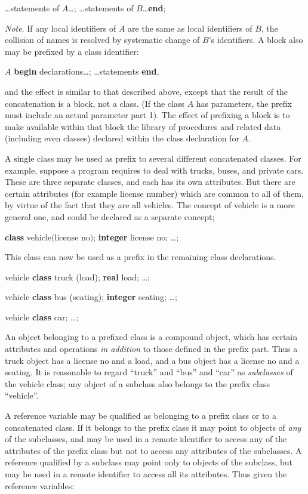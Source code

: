 \tabto*{5.9em}\dots statements of $A$\dots; \dots statements of $B$\dots \textbf{end};

\textit{Note}. If any local identifiers of $A$ are the same as local identifiers of $B$, the collision of names is resolved by systematic change of $B$'s identifiers. A block also may be prefixed by a class identifier:

\quad $A$ \textbf{begin} declarations\dots; \dots statements \textbf{end},

\noindent
and the effect is similar to that described above, except that the result of the concatenation is a block, not a class. (If the class $A$ has parameters, the prefix must include an actual parameter part 1). The effect of prefixing a block is to make available within that block the library of procedures and related data (including even classes) declared within the class declaration for $A$.

A single class may be used as prefix to several different concatenated classes. For example, suppose a program requires to deal with trucks, buses, and private cars. These are three separate classes, and each has its own attributes. But there are certain attributes (for example license number) which are common to all of them, by virtue of the fact that they are all vehicles. The concept of vehicle is a more general one, and could be declared as a separate concept;

\quad \textbf{class} vehicle$($license no$)$; \textbf{integer} license no; \dots;

\noindent
This class can now be used as a prefix in the remaining class declarations.

\quad vehicle \textbf{class} truck (load); \textbf{real} load; \dots;

\quad vehicle \textbf{class} bus (seating); \textbf{integer} seating; \dots;

\quad vehicle \textbf{class} car; \dots;

An object belonging to a prefixed class is a compound object, which has certain attributes and operations \textit{in addition} to those defined in the prefix part. Thus a truck object has a license no and a load, and a bus object has a license no and a seating. It is reasonable to regard ``truck'' and ``bus'' and ``car'' as \textit{subclasses} of the vehicle class; any object of a subclass also belongs to the prefix class ``vehicle''.

A reference variable may be qualified as belonging to a prefix class or to a concatenated class. If it belongs to the prefix class it may point to objects of \textit{any} of the subclasses, and may be used in a remote identifier to access any of the attributes of the prefix class but not to access any attributes of the subclasses. A reference qualified by a subclass may point only to objects of the subclass, but may be used in a remote identifier to access all its attributes. Thus given the reference variables:

